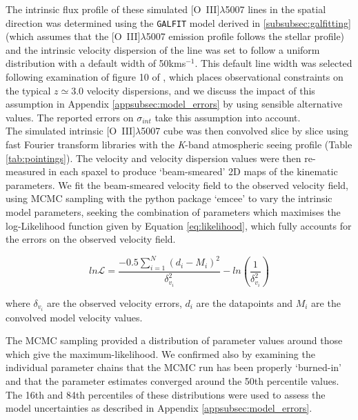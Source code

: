 \documentclass[fleqn,usenatbib]{mnras}
\newcommand{\Lagr}{\mathcal{L}}
\begin{document}
The intrinsic flux profile of these simulated [O~{\sc III}]$\lambda$5007 lines in the spatial direction was determined using the {\tt GALFIT} model derived in \cref{subsubsec:galfitting} (which assumes that the [O~{\sc III}]$\lambda$5007 emission profile follows the stellar profile) and the intrinsic velocity dispersion of the line was set to follow a uniform distribution with a default width of 50kms$^{-1}$.
This default line width was selected following examination of figure 10 of \cite{Wisnioski2015}, which places observational constraints on the typical $z\simeq3.0$ velocity dispersions, and we discuss the impact of this assumption in Appendix \ref{appsubsec:model_errors} by using sensible alternative values.
The reported errors on $\sigma_{int}$ take this assumption into account. \\

The simulated intrinsic [O~{\sc III}]$\lambda$5007 cube was then convolved slice by slice using fast Fourier transform libraries with the {\it K}-band atmospheric seeing profile (Table \ref{tab:pointings}).
The velocity and velocity dispersion values were then re-measured in each spaxel to produce `beam-smeared' 2D maps of the kinematic parameters.
We fit the beam-smeared velocity field to the observed velocity field, using MCMC sampling with the python package `emcee' \citep{Foreman-Mackey2013} to vary the intrinsic model parameters, seeking the combination of parameters which maximises the log-Likelihood function given by Equation \ref{eq:likelihood}, which fully accounts for the errors on the observed velocity field.

\begin{equation}\label{eq:likelihood}
   ln\Lagr = \frac{-0.5\sum_{i=1}^{N}(d_{i} - M_{i})^{2}}{\delta_{v_{i}}^{2}} - ln\left(\frac{1}{\delta_{v_{i}}^{2}}\right)
\end{equation}

\noindent
where $\delta_{v_{i}}$ are the observed velocity errors, $d_{i}$ are the datapoints and $M_{i}$ are the convolved model velocity values.

The MCMC sampling provided a distribution of parameter values around those which give the maximum-likelihood.
We confirmed also by examining the individual parameter chains that the MCMC run has been properly `burned-in' and that the parameter estimates converged around the 50th percentile values.
The 16th and 84th percentiles of these distributions were used to assess the model uncertainties as described in Appendix \ref{appsubsec:model_errors}.
\end{document}
